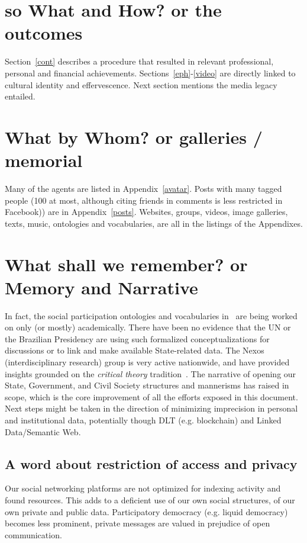 \documentclass[a4paper]{article}
\begin{document}
\section{so What and How? or the outcomes}
Section~\ref{cont} describes a procedure that resulted in
relevant professional, personal and financial achievements.
Sections~\ref{eph}-\ref{video} are directly linked to cultural identity and effervescence.
Next section mentions the media legacy entailed.

\section{What by Whom? or galleries / memorial}
Many of the agents are listed in Appendix~\ref{avatar}.
Posts with many tagged people (100 at most, although citing friends in comments is less restricted in Facebook)) are in Appendix~\ref{posts}.
Websites, groups, videos, image galleries, texts, music, ontologies and vocabularies, are all in the listings of the Appendixes.

\section{What shall we remember? or Memory and Narrative}
In fact, the social participation ontologies and vocabularies in~\cite{thesis}
are being worked on only (or mostly) academically.
There have been no evidence that the UN or the Brazilian Presidency are using
such formalized conceptualizations for discussions or to link and make available State-related data.
The Nexos (interdisciplinary research) group is very active nationwide,
and have provided insights grounded on the \emph{critical theory} tradition~\cite{anPhy2,thesis}.
The narrative of opening our State, Government, and Civil Society structures
and mannerisms has raised in scope, which is the core improvement of all
the efforts exposed in this document.
Next steps might be taken in the direction of minimizing imprecision
in personal and institutional data,
potentially though DLT (e.g. blockchain) and Linked Data/Semantic Web.

\subsection{A word about restriction of access and privacy}
Our social networking platforms are not optimized for indexing activity
and found resources.
This adds to a deficient use of our own social structures,
of our own private and public data.
Participatory democracy (e.g. liquid democracy) becomes less prominent,
private messages are valued in prejudice of open communication.
\end{document}
